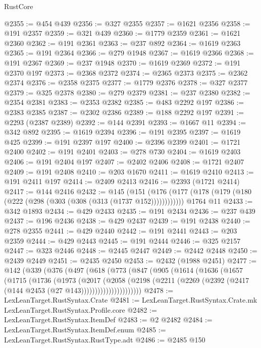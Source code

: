 \begin{lexlean}{RustCore}
\begin{coremodule}
@2355 := @454 @439
@2356 := @327 @2355
@2357 := @1621 @2356
@2358 := @191 @2357
@2359 := @321 @439
@2360 := @1779 @2359
@2361 := @1621 @2360
@2362 := @191 @2361
@2363 := @237 @892
@2364 := @1619 @2363
@2365 := @191 @2364
@2366 := @279 @1948
@2367 := @1619 @2366
@2368 := @191 @2367
@2369 := @237 @1948
@2370 := @1619 @2369
@2372 := @191 @2370 @197
@2373 := @2368 @2372
@2374 := @2365 @2373
@2375 := @2362 @2374
@2376 := @2358 @2375
@2377 := @1779 @2376
@2378 := @327 @2377
@2379 := @325 @2378
@2380 := @279 @2379
@2381 := @237 @2380
@2382 := @2354 @2381
@2383 := @2353 @2382
@2385 := @483 @2292 @197
@2386 := @2383 @2385
@2387 := @2302 @2386
@2389 := @188 @2292 @197
@2391 := @2293 (@2387 @2389)
@2392 := @144 @2391
@2393 := @1667 @11
@2394 := @342 @892
@2395 := @1619 @2394
@2396 := @191 @2395
@2397 := @1619 @425
@2399 := @191 @2397 @197
@2400 := @2396 @2399
@2401 := @1721 @2400
@2402 := @191 @2401
@2403 := @278 @730
@2404 := @1619 @2403
@2406 := @191 @2404 @197
@2407 := @2402 @2406
@2408 := @1721 @2407
@2409 := @191 @2408
@2410 := @203 @1670
@2411 := @1619 @2410
@2413 := @191 @2411 @197
@2414 := @2409 @2413
@2416 := @2393 (@1721 @2414)
@2417 := @144 @2416
@2432 := @145
    (@151 (@176 (@177 (@178 (@179 (@180 (@222 (@298 (@303 (@308 (@313 (@1737 @152))))))))))))
    @1764
    @11
@2433 := @342 @1893
@2434 := @429 @2433
@2435 := @191 @2434
@2436 := @237 @439
@2437 := @196 @2436
@2438 := @429 @2437
@2439 := @191 @2438
@2440 := @278 @2355
@2441 := @429 @2440
@2442 := @191 @2441
@2443 := @203 @2359
@2444 := @429 @2443
@2445 := @191 @2444
@2446 := @325 @2157
@2447 := @323 @2446
@2448 := @2445 @2447
@2449 := @2442 @2448
@2450 := @2439 @2449
@2451 := @2435 @2450
@2453 := @2432 (@1988 @2451)
@2477 := @142
    (@339
      (@376
        (@497
          (@618
            (@773
              (@847
                (@905
                  (@1614
                    (@1636
                      (@1657
                        (@1715
                          (@1736
                            (@1973
                              (@2017
                                (@2058
                                  (@2198
                                    (@2211
                                      (@2269
                                        (@2392 (@2417 (@144 @2453 (@27 @143))))))))))))))))))))))
@2478 := LexLeanTarget.RustSyntax.Crate
@2481 := LexLeanTarget.RustSyntax.Crate.mk LexLeanTarget.RustSyntax.Profile.core
@2482 := LexLeanTarget.RustSyntax.ItemDef
@2483 := @2 @2482
@2484 := LexLeanTarget.RustSyntax.ItemDef.enum
@2485 := LexLeanTarget.RustSyntax.RustType.adt
@2486 := @2485 @150

\end{coremodule}
\end{lexlean}
